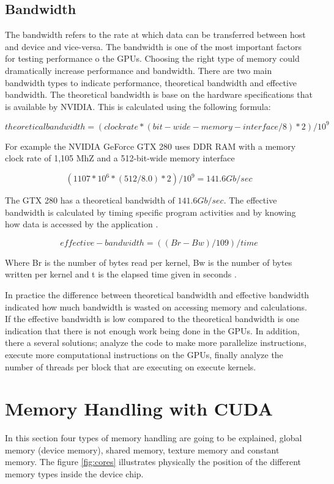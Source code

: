 \subsection{Bandwidth}

The bandwidth refers to the rate at which data can be transferred between host and device and vice-versa. The bandwidth is one of the most important factors for testing performance o the GPUs. Choosing the right type of memory could dramatically increase performance and bandwidth. There are two main bandwidth types to indicate performance, theoretical bandwidth and effective bandwidth. The theoretical bandwidth is base on the hardware specifications that is available by NVIDIA. This is calculated using the following formula:

$$ theoretical bandwidth = (clock rate * (bit-wide-memory-interface / 8 )*2) / 10^9 $$

For example the NVIDIA GeForce GTX 280 uses DDR RAM with a memory clock rate of 1,105 MhZ and a 512-bit-wide memory interface

$$ (1107 * 10^6 * (512/8.0) *2 )/10^9 = 141.6 Gb /sec$$

The GTX 280 has a theoretical bandwidth of $141.6Gb/sec$.
The effective bandwidth is calculated by timing specific program activities and by knowing how data is accessed by the application \cite{practices}.

$$effective-bandwidth = ((Br - Bw) / 109 )/time$$

Where Br is the number of bytes read per kernel, Bw is the number of bytes written per kernel and  t is the elapsed time given in seconds \cite{fortran}.

In practice the difference between theoretical bandwidth and effective bandwidth indicated how much bandwidth is wasted on accessing memory and calculations. If the effective bandwidth is low compared to the theoretical bandwidth is one indication that there is not enough work being done in the GPUs. In addition, there a several solutions; analyze the code to make more parallelize instructions, execute more computational instructions on the GPUs, finally analyze the number of threads per block that are executing on execute kernels.


\section{Memory Handling with CUDA}

In this section four types of memory handling are going to be explained, global memory (device memory), shared memory, texture memory and constant memory. The figure \ref{fig:cores} illustrates physically the position of the different memory types inside the device chip.


